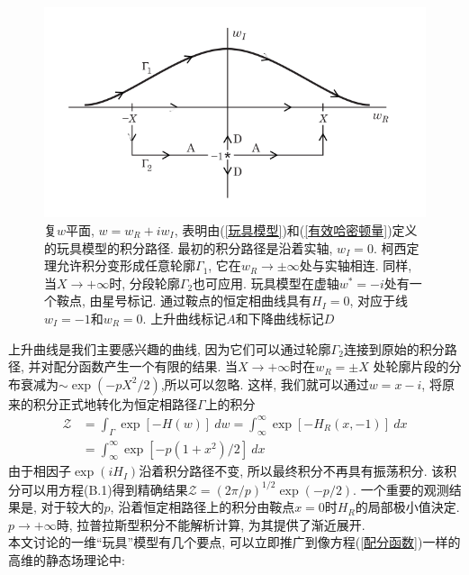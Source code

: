 \begin{figure}[H]
      \centering
      \includegraphics[width=12cm]{./figures/1.png}
      \caption{复$w$平面, $w =w_R + iw_I$, 表明由(\ref{玩具模型})和(\ref{有效哈密顿量})定义的玩具模型的积分路径. 最初的积分路径是沿着实轴, $w_I=0$. 柯西定理允许积分变形成任意轮廓$\Gamma_1$, 它在$w_R \rightarrow \pm \infty $处与实轴相连. 同样, 当$X \rightarrow +\infty$时, 分段轮廓$\Gamma_2$也可应用. 玩具模型在虚轴$w^*= -i$处有一个鞍点, 由星号标记. 通过鞍点的恒定相曲线具有$H_I=0$, 对应于线$w_I=-1$和$w_R=0$. 上升曲线标记$A$和下降曲线标记$D$}
      \label{复平面w}
\end{figure}
上升曲线是我们主要感兴趣的曲线, 因为它们可以通过轮廓$\Gamma_2$连接到原始的积分路径, 并对配分函数产生一个有限的结果. 当$ X \rightarrow +\infty$时在$w_R=\pm X$ 处轮廓片段的分布衰减为$\sim \exp(-pX^2/2)$,所以可以忽略. 这样, 我们就可以通过$w =x -i$, 将原来的积分正式地转化为恒定相路径$\Gamma$上的积分\\
\begin{equation}
\begin{aligned}
\mathcal{Z} &= \int_\Gamma \exp[-H(w)] \ dw = \int_\infty^\infty \exp[-H_R(x,-1)] \ dx\\
& =\int_\infty^\infty \exp[-p(1+x^2)/2] \ dx \label{恒定相路径积分}
\end{aligned}
\end{equation}
由于相因子$\exp(iH_I)$沿着积分路径不变, 所以最终积分不再具有振荡积分. 该积分可以用方程(B.1)得到精确结果$\mathcal{Z}=(2\pi/p)^{1/2}\exp(-p/2)$. 一个重要的观测结果是, 对于较大的$p$, 沿着恒定相路径上的积分由鞍点$x=0$时$H_R$的局部极小值決定. $p\rightarrow +\infty$時, 拉普拉斯型积分不能解析计算, 为其提供了渐近展开. \\

本文讨论的一维“玩具”模型有几个要点, 可以立即推广到像方程(\ref{配分函数})一样的高维的静态场理论中:\\

